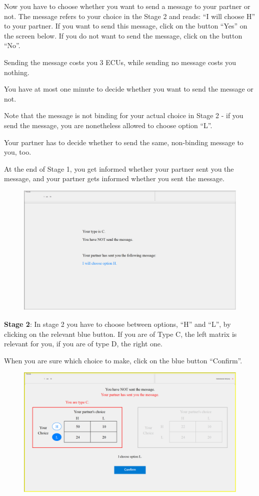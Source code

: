 \documentclass[12pt]{article}
\theoremstyle{break}
\begin{document}
Now you have to choose whether you want to send a message to your partner or not. The message refers to your choice in the Stage 2 and reads: “I will choose H” to your partner. If you want to send this message, click on the button ``Yes'' on the screen below. If you do not want to send the message, click on the button ``No''. 

Sending the message costs you 3 ECUs, while sending no message costs you nothing.

You have at most one minute to decide whether you want to send the message or not. 

Note that the message is not binding for your actual choice in Stage 2 - if you send the message, you are nonetheless allowed to choose option ``L''.

Your partner has to decide whether to send the same, non-binding message to you, too.

At the end of Stage 1, you get informed whether your partner sent you the message, and your partner gets informed whether you sent the message. 

\begin{figure}[h]
  \centering
    \includegraphics[width=.9\textwidth]{fig2-CT-instructions.png}
\label{fig:fig2-CT-instructions}
\end{figure}


\textbf{Stage 2}: In stage 2 you have to choose between options, ``H'' and ``L'', by clicking on the relevant blue button. 
If you are of Type C, the left matrix is relevant for you, if you are of type D, the right one.

When you are sure which choice to make, click on the blue button ``Confirm''.

 \begin{figure}[h]
   \centering
     \includegraphics[width=.9\textwidth]{fig3-FC-instructions.png}
   \label{fig:fig3-FC-instructions}
 \end{figure}
 
\end{document}
